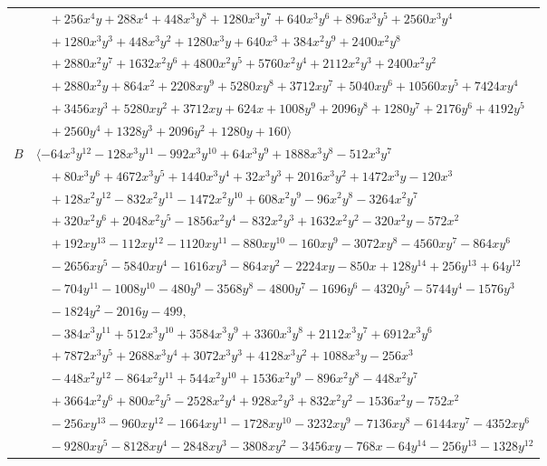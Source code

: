 \documentclass[11pt]{article}
\begin{document}
\begin{longtable}{@{}ll@{}}
 & $\quad +256x^{4}y+288x^{4}+448x^{3}y^{8}+1280x^{3}y^{7}+640x^{3}y^{6}+896x^{3}y^{5}+2560x^{3}y^{4}$\\
 & $\quad +1280x^{3}y^{3}+448x^{3}y^{2}+1280x^{3}y+640x^{3}+384x^{2}y^{9}+2400x^{2}y^{8}$\\
 & $\quad +2880x^{2}y^{7}+1632x^{2}y^{6}+4800x^{2}y^{5}+5760x^{2}y^{4}+2112x^{2}y^{3}+2400x^{2}y^{2}$\\
 & $\quad +2880x^{2}y+864x^{2}+2208xy^{9}+5280xy^{8}+3712xy^{7}+5040xy^{6}+10560xy^{5}+7424xy^{4}$\\
 & $\quad +3456xy^{3}+5280xy^{2}+3712xy+624x+1008y^{9}+2096y^{8}+1280y^{7}+2176y^{6}+4192y^{5}$\\
 & $\quad +2560y^{4}+1328y^{3}+2096y^{2}+1280y+160\rangle$\\
$B$ & $\langle -64x^{3}y^{12}-128x^{3}y^{11}-992x^{3}y^{10}+64x^{3}y^{9}+1888x^{3}y^{8}-512x^{3}y^{7}$\\
 & $\quad +80x^{3}y^{6}+4672x^{3}y^{5}+1440x^{3}y^{4}+32x^{3}y^{3}+2016x^{3}y^{2}+1472x^{3}y-120x^{3}$\\
 & $\quad +128x^{2}y^{12}-832x^{2}y^{11}-1472x^{2}y^{10}+608x^{2}y^{9}-96x^{2}y^{8}-3264x^{2}y^{7}$\\
 & $\quad +320x^{2}y^{6}+2048x^{2}y^{5}-1856x^{2}y^{4}-832x^{2}y^{3}+1632x^{2}y^{2}-320x^{2}y-572x^{2}$\\
 & $\quad +192xy^{13}-112xy^{12}-1120xy^{11}-880xy^{10}-160xy^{9}-3072xy^{8}-4560xy^{7}-864xy^{6}$\\
 & $\quad -2656xy^{5}-5840xy^{4}-1616xy^{3}-864xy^{2}-2224xy-850x+128y^{14}+256y^{13}+64y^{12}$\\
 & $\quad -704y^{11}-1008y^{10}-480y^{9}-3568y^{8}-4800y^{7}-1696y^{6}-4320y^{5}-5744y^{4}-1576y^{3}$\\
 & $\quad -1824y^{2}-2016y-499,$\\
 & $\quad -384x^{3}y^{11}+512x^{3}y^{10}+3584x^{3}y^{9}+3360x^{3}y^{8}+2112x^{3}y^{7}+6912x^{3}y^{6}$\\
 & $\quad +7872x^{3}y^{5}+2688x^{3}y^{4}+3072x^{3}y^{3}+4128x^{3}y^{2}+1088x^{3}y-256x^{3}$\\
 & $\quad -448x^{2}y^{12}-864x^{2}y^{11}+544x^{2}y^{10}+1536x^{2}y^{9}-896x^{2}y^{8}-448x^{2}y^{7}$\\
 & $\quad +3664x^{2}y^{6}+800x^{2}y^{5}-2528x^{2}y^{4}+928x^{2}y^{3}+832x^{2}y^{2}-1536x^{2}y-752x^{2}$\\
 & $\quad -256xy^{13}-960xy^{12}-1664xy^{11}-1728xy^{10}-3232xy^{9}-7136xy^{8}-6144xy^{7}-4352xy^{6}$\\
 & $\quad -9280xy^{5}-8128xy^{4}-2848xy^{3}-3808xy^{2}-3456xy-768x-64y^{14}-256y^{13}-1328y^{12}$\\

\end{longtable}
\end{document}
